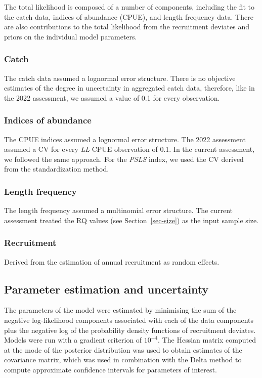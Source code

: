 \documentclass[
]{scrartcl}
\begin{document}
The total likelihood is composed of a number of components, including
the fit to the catch data, indices of abundance (CPUE), and length
frequency data. There are also contributions to the total likelihood
from the recruitment deviates and priors on the individual model
parameters.

\subsubsection{Catch}\label{catch}

The catch data assumed a lognormal error structure. There is no
objective estimates of the degree in uncertainty in aggregated catch
data, therefore, like in the 2022 assessment, we assumed a value of 0.1
for every observation.

\subsubsection{Indices of abundance}\label{indices-of-abundance}

The CPUE indices assumed a lognormal error structure. The 2022
assessment assumed a CV for every \emph{LL} CPUE observation of 0.1. In
the current assessment, we followed the same approach. For the
\emph{PSLS} index, we used the CV derived from the standardization
method.

\subsubsection{Length frequency}\label{length-frequency}

The length frequency assumed a multinomial error structure. The current
assessment treated the RQ values (see Section~\ref{sec-size}) as the
input sample size.

\subsubsection{Recruitment}\label{recruitment-1}

Derived from the estimation of annual recruitment as random effects.

\subsection{Parameter estimation and
uncertainty}\label{parameter-estimation-and-uncertainty}

The parameters of the model were estimated by minimising the sum of the
negative log-likelihood components associated with each of the data
components plus the negative log of the probability density functions of
recruitment deviates. Models were run with a gradient criterion of
\(10^{-4}\). The Hessian matrix computed at the mode of the posterior
distribution was used to obtain estimates of the covariance matrix,
which was used in combination with the Delta method to compute
approximate confidence intervals for parameters of interest.
\end{document}
